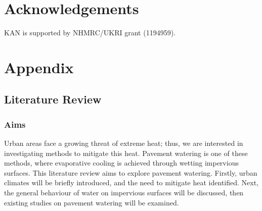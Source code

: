 \documentclass[final,3p,times,authoryear]{elsarticle}
\begin{document}






 
 




\clearpage

\section{Acknowledgements}\label{sec:ack}
KAN is supported by NHMRC/UKRI grant (1194959).

\appendix
\setcounter{table}{0}
\renewcommand{\thetable}{A\arabic{table}}

\section{Appendix}\label{sec:appendix7}
\subsection{Literature Review}\label{sec:appendix7.1}
\subsubsection{Aims}\label{sec:appendix7.1.1}
Urban areas face a growing threat of extreme heat; thus, we are interested in
investigating methods to mitigate this heat. Pavement watering is one of these methods,
where evaporative cooling is achieved through wetting impervious surfaces. This
literature review aims to explore pavement watering. Firstly, urban climates will be
briefly introduced, and the need to mitigate heat identified. Next, the general behaviour
of water on impervious surfaces will be discussed, then existing studies on pavement
watering will be examined.
\end{document}
